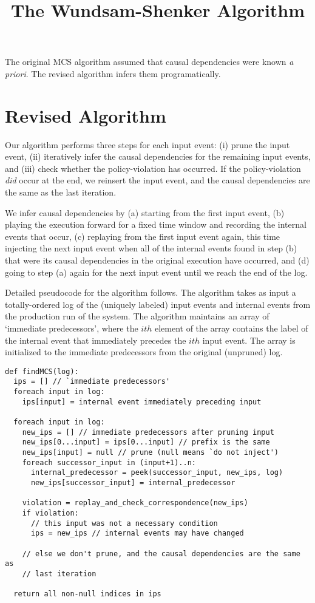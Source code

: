 \documentclass[10pt,a4paper,titlepage]{article}
\newcommand{\apriori}{{\it a priori}}
\begin{document}
\title{The Wundsam-Shenker Algorithm\textsuperscript{\texttrademark}}
  \date{}
  \maketitle{}

The original MCS algorithm assumed that causal dependencies were known
\apriori. The revised algorithm infers them programatically.

\section*{Revised Algorithm}

Our algorithm performs three steps for each input event:
(i) prune the input event, (ii) iteratively infer the causal dependencies for the
remaining input events, and (iii) check whether the policy-violation has occurred. If
the policy-violation {\it did} occur at the end, we reinsert the input event, and the causal
dependencies are the same as the last iteration.

We infer causal dependencies by (a) starting from the first input event, (b)
playing the execution forward for a fixed time window and recording the internal events
that occur, (c) replaying from the first input event again, this time injecting
the next input event when all of the internal events found in step (b) that
were its causal dependencies in the original execution have occurred, and (d)
going to step (a) again for the next input event until we reach the end of
the log.

Detailed pseudocode for the algorithm follows. The algorithm takes as input a
totally-ordered log of the (uniquely labeled) input events and internal events from the production run
of the system. The algorithm maintains an array of `immediate predecessors', where the
$ith$ element of the array contains the label of the internal event that
immediately precedes the $ith$ input event. The array is initialized to the immediate
predecessors from the original (unpruned) log.

\begin{verbatim}
def findMCS(log):
  ips = [] // `immediate predecessors'
  foreach input in log:
    ips[input] = internal event immediately preceding input
  
  foreach input in log:
    new_ips = [] // immediate predecessors after pruning input
    new_ips[0...input] = ips[0...input] // prefix is the same
    new_ips[input] = null // prune (null means `do not inject')
    foreach successor_input in (input+1)..n:
      internal_predecessor = peek(successor_input, new_ips, log)
      new_ips[successor_input] = internal_predecessor
    
    violation = replay_and_check_correspondence(new_ips)
    if violation:
      // this input was not a necessary condition
      ips = new_ips // internal events may have changed

    // else we don't prune, and the causal dependencies are the same as
    // last iteration
  
  return all non-null indices in ips
\end{verbatim}
\end{document}

